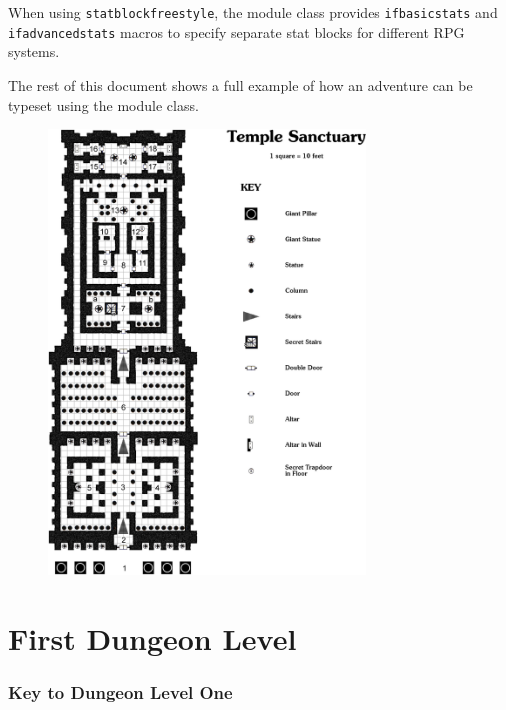 \documentclass[letterpaper,serif]{module}
\begin{document}
\noindent When using \verb|statblockfreestyle|, the module class provides \verb|ifbasicstats| and \verb|ifadvancedstats| macros to specify separate
stat blocks for different RPG systems.

The rest of this document shows a full example of how an adventure can be typeset using the module class.

\newpage



\begin{figure}[p]
\centering
\includegraphics[width=0.75\textwidth]{module_map.png}
\vspace{2em}
\label{img:map}
\end{figure}

\part{First Dungeon Level}
\label{example_dungeon}

\section*{Key to Dungeon Level One}
\end{document}
